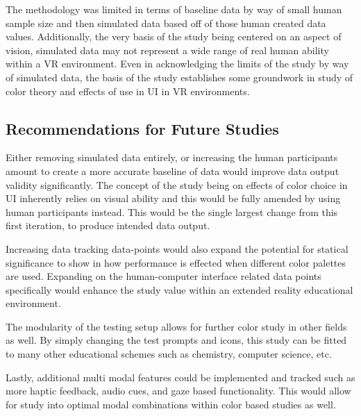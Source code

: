 \documentclass[acmlarge]{acmart}
\begin{document}
The methodology was limited in terms of baseline data by way of small human sample size and then simulated data based off of those human created data values. Additionally, the very basis of the study being centered on an aspect of vision, simulated data may not represent a wide range of real human ability within a VR environment.
Even in acknowledging the limits of the study by way of simulated data, the basis of the study establishes some groundwork in study of color theory and effects of use in UI in VR environments.

\subsection{Recommendations for Future Studies}
Either removing simulated data entirely, or increasing the human participants amount to create a more accurate baseline of data would improve data output validity significantly. The concept of the study being on effects of color choice in UI inherently relies on visual ability and this would be fully amended by using human participants instead. This would be the single largest change from this first iteration, to produce intended data output.

Increasing data tracking data-points would also expand the potential for statical significance to show in how performance is effected when different color palettes are used. Expanding on the human-computer interface related data points specifically would enhance the study value within an extended reality educational environment. 

The modularity of the testing setup allows for further color study in other fields as well. By simply changing the test prompts and icons, this study can be fitted to many other educational schemes such as chemistry, computer science, etc.

Lastly, additional multi modal features could be implemented and tracked such as more haptic feedback, audio cues, and gaze based functionality. This would allow for study into optimal modal combinations within color based studies as well.







\end{document}
